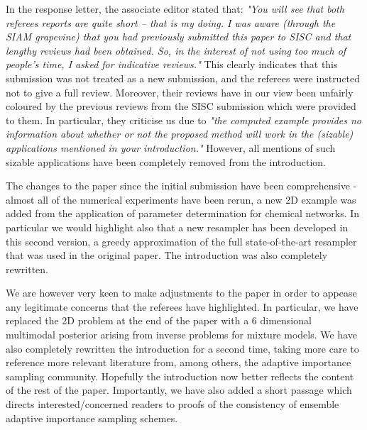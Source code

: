\documentclass{letter}
\begin{document}
\begin{letter}{ }
In the response letter, the associate editor stated that: \emph{"You will see that both referees reports are quite short -- that is my doing. I was aware (through the SIAM grapevine) that you had previously submitted this paper to SISC and that lengthy reviews had been obtained. So, in the interest of not using too much of people's time, I asked for indicative reviews."} This clearly indicates that this submission was not treated as a new submission, and the referees were instructed not to give a full review. Moreover, their reviews have in our view been unfairly coloured by the previous reviews from the SISC submission which were provided to them. In particular, they criticise us due to \emph{"the computed example provides no information about whether or not the proposed method will work in the (sizable) applications mentioned in your introduction."} However, all mentions of such sizable applications have been completely removed from the introduction.

The changes to the paper since the initial submission have been comprehensive - almost all of the numerical experiments have been rerun, a new 2D example was added from the application of parameter determination for chemical networks. In particular we would highlight also that a new resampler has been developed in this second version, a greedy approximation of the full state-of-the-art resampler that was used in the original paper. The introduction was also completely rewritten.

We are however very keen to make adjustments to the paper in order to appease any legitimate concerns that the referees have highlighted. In particular, we have replaced the 2D problem at the end of the paper with a 6 dimensional multimodal posterior arising from inverse problems for mixture models. We have also completely rewritten the introduction for a second time, taking more care to reference more relevant literature from, among others, the adaptive importance sampling community. Hopefully the introduction now better reflects the content of the rest of the paper. Importantly, we have also added a short passage which directs interested/concerned readers to proofs of the consistency of ensemble adaptive importance sampling schemes.


\end{letter}
\end{document}
